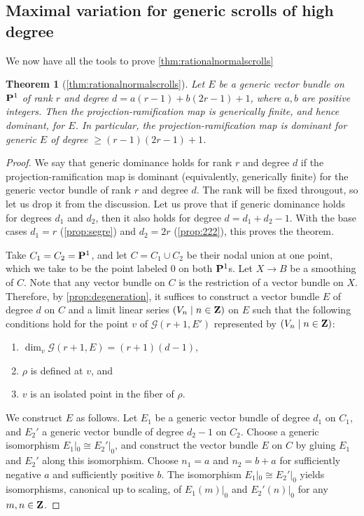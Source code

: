 \documentclass[11pt,reqno]{amsart}
\theoremstyle{plain}
\newtheorem{theorem}{Theorem}[section]
\theoremstyle{definition}
\theoremstyle{remark}
\numberwithin{equation}{section}
\renewcommand{\to}{{\longrightarrow}}
\numberwithin{equation}{section}
\begin{document}
\subsection{Maximal variation for generic scrolls of high degree}
We now have all the tools to prove \autoref{thm:rationalnormalscrolls}
\begin{theorem}[\autoref{thm:rationalnormalscrolls}]
  \label{thm:actualrationalnormalscrolls}
  Let $E$ be a generic vector bundle on $\P^1$ of rank $r$ and degree $d = a(r-1) + b(2r-1)+1$, where $a, b$ are positive integers.
  Then the projection-ramification map is generically finite, and hence dominant, for $E$.
  In particular, the projection-ramification map is dominant for generic $E$ of degree $\geq (r-1)(2r-1)+1$.
\end{theorem}
\begin{proof}
  We say that generic dominance holds for rank $r$ and degree $d$ if the projection-ramification map is dominant (equivalently, generically finite) for the generic vector bundle of rank $r$ and degree $d$.
  The rank will be fixed througout, so let us drop it from the discussion.
  Let us prove that if generic dominance holds for degrees $d_1$ and $d_2$, then it also holds for degree $d = d_1 + d_2 - 1 $.
  With the base cases $d_1 = r$ (\autoref{prop:segre}) and $d_2 = 2r$ (\autoref{prop:222}), this proves the theorem.

  Take $C_1 = C_2 = \P^1$, and let $C = C_1 \cup C_2$ be their nodal union at one point, which we take to be the point labeled $0$ on both $\P^1$s.
  Let $X \to B$ be a smoothing of $C$.
  Note that any vector bundle on $C$ is the restriction of a vector bundle on $X$.
  Therefore, by \autoref{prop:degeneration}, it suffices to construct a vector bundle $E$ of degree $d$ on $C$ and a limit linear series $(V_n \mid n \in \Z)$ on $E$ such that the following conditions hold for the point $v$ of $\mathcal G (r+1, E')$ represented by $(V_n \mid n \in \Z)$:
  \begin{enumerate}
  \item $\dim_v \mathcal G(r+1, E) = (r+1)(d-1)$,
  \item $\rho$ is defined at $v$, and
  \item $v$ is an isolated point in the fiber of $\rho$.
  \end{enumerate}

  We construct $E$ as follows.
  Let $E_1$ be a generic vector bundle of degree $d_1$ on $C_1$, and $E_2'$ a generic vector bundle of degree $d_2 - 1$ on $C_2$.
  Choose a generic isomorphism $E_1|_0 \cong E_2'|_0$, and construct the vector bundle $E$ on $C$ by gluing $E_1$ and $E_2'$ along this isomorphism.
  Choose $n_1 = a$ and $n_2 = b+a$ for sufficiently negative $a$ and sufficiently positive $b$.
  The isomorphism $E_1 |_0 \cong E_2'|_0$ yields isomorphisms, canonical up to scaling, of $E_1(m)|_0$ and $E_2'(n)|_0$ for any $m, n \in \Z$.


\end{proof}
\end{document}
